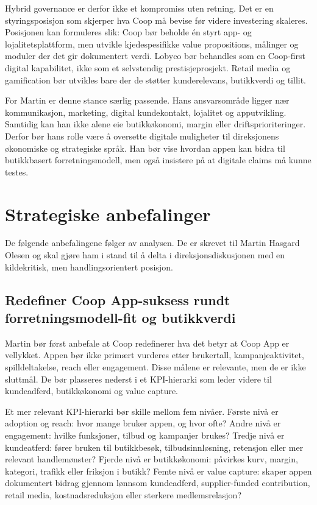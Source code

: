 \documentclass[12pt,a4paper]{article}
\begin{document}
Hybrid governance er derfor ikke et kompromiss uten retning. Det er en styringsposisjon som skjerper hva Coop må bevise før videre investering skaleres. Posisjonen kan formuleres slik: Coop bør beholde én styrt app- og lojalitetsplattform, men utvikle kjedespesifikke value propositions, målinger og moduler der det gir dokumentert verdi. Lobyco bør behandles som en Coop-first digital kapabilitet, ikke som et selvstendig prestisjeprosjekt. Retail media og gamification bør utvikles bare der de støtter kunderelevans, butikkverdi og tillit.

For Martin er denne stance særlig passende. Hans ansvarsområde ligger nær kommunikasjon, marketing, digital kundekontakt, lojalitet og apputvikling. Samtidig kan han ikke alene eie butikkøkonomi, margin eller driftsprioriteringer. Derfor bør hans rolle være å oversette digitale muligheter til direksjonens økonomiske og strategiske språk. Han bør vise hvordan appen kan bidra til butikkbasert forretningsmodell, men også insistere på at digitale claims må kunne testes.

\section{Strategiske anbefalinger}

De følgende anbefalingene følger av analysen. De er skrevet til Martin Hasgard Olesen og skal gjøre ham i stand til å delta i direksjonsdiskusjonen med en kildekritisk, men handlingsorientert posisjon.

\subsection{Redefiner Coop App-suksess rundt forretningsmodell-fit og butikkverdi}

Martin bør først anbefale at Coop redefinerer hva det betyr at Coop App er vellykket. Appen bør ikke primært vurderes etter brukertall, kampanjeaktivitet, spilldeltakelse, reach eller engagement. Disse målene er relevante, men de er ikke sluttmål. De bør plasseres nederst i et KPI-hierarki som leder videre til kundeadferd, butikkøkonomi og value capture.

Et mer relevant KPI-hierarki bør skille mellom fem nivåer. Første nivå er adoption og reach: hvor mange bruker appen, og hvor ofte? Andre nivå er engagement: hvilke funksjoner, tilbud og kampanjer brukes? Tredje nivå er kundeatferd: fører bruken til butikkbesøk, tilbudsinnløsning, retensjon eller mer relevant handlemønster? Fjerde nivå er butikkøkonomi: påvirkes kurv, margin, kategori, trafikk eller friksjon i butikk? Femte nivå er value capture: skaper appen dokumentert bidrag gjennom lønnsom kundeadferd, supplier-funded contribution, retail media, kostnadsreduksjon eller sterkere medlemsrelasjon?
\end{document}
